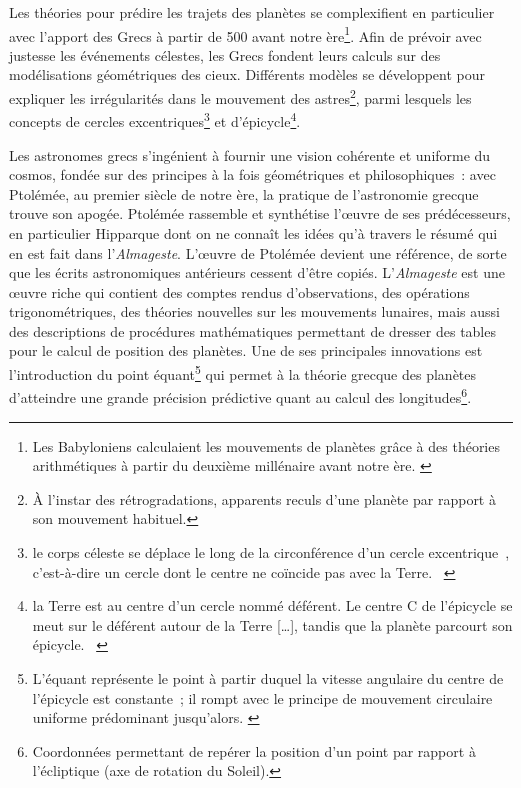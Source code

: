 \documentclass[a4paper,12pt,twoside]{book}
\newcommand{\p}{[\ldots]\xspace}
\newcommand{\g}[1]{\og#1~\fg}
\begin{document}
Les théories pour prédire les trajets des planètes se complexifient en particulier avec l'apport des Grecs à partir de 500 avant notre ère\footnote{Les Babyloniens calculaient les mouvements de planètes grâce à des théories arithmétiques à partir du deuxième millénaire avant notre ère. \cite{evansHistoryAstronomy}}. Afin de prévoir avec justesse les événements célestes, les Grecs fondent leurs calculs sur des modélisations géométriques des cieux. Différents modèles se développent pour expliquer les irrégularités dans le mouvement des astres\footnote{À l'instar des rétrogradations, apparents reculs d'une planète par rapport à son mouvement habituel.}, parmi lesquels les concepts de cercles excentriques\footnote{\g{le corps céleste se déplace le long de la circonférence d'un cercle \g{excentrique}, c'est-à-dire un cercle dont le centre ne coïncide pas avec la Terre.} \cite{bessouLumieresUniversHistoire}} et d'épicycle\footnote{\g{la Terre est au centre d'un cercle nommé déférent. Le centre C de l'épicycle se meut sur le déférent autour de la Terre \p, tandis que la planète parcourt son épicycle.} \cite{bessouLumieresUniversHistoire}}.

Les astronomes grecs s'ingénient à fournir une vision cohérente et uniforme du cosmos, fondée sur des principes à la fois géométriques et philosophiques~: avec Ptolémée, au premier siècle de notre ère, la pratique de l'astronomie grecque trouve son apogée. Ptolémée rassemble et synthétise l'œuvre de ses prédécesseurs, en particulier Hipparque dont on ne connaît les idées qu'à travers le résumé qui en est fait dans l'\emph{Almageste}. L'œuvre de Ptolémée devient une référence, de sorte que les écrits astronomiques antérieurs cessent d'être copiés. L'\emph{Almageste} est une œuvre riche qui contient des comptes rendus d'observations, des opérations trigonométriques, des théories nouvelles sur les mouvements lunaires, mais aussi des descriptions de procédures mathématiques permettant de dresser des tables pour le calcul de position des planètes. Une de ses principales innovations est l'introduction du point équant\footnote{L'équant représente le point à partir duquel la vitesse angulaire du centre de l'épicycle est constante~; il rompt avec le principe de mouvement circulaire uniforme prédominant jusqu'alors. \cite{bessouLumieresUniversHistoire}} qui permet à la théorie grecque des planètes d'atteindre une grande précision prédictive quant au calcul des longitudes\footnote{Coordonnées permettant de repérer la position d'un point par rapport à l'écliptique (axe de rotation du Soleil).}.
\end{document}

